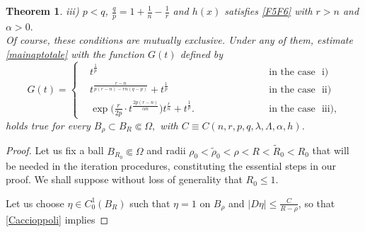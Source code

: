\documentclass[12pt]{amsart}
\newtheorem{theorem}{Theorem}[section]
\theoremstyle{definition}
\numberwithin{equation}{section}
\numberwithin{equation}{section}
\begin{document}
{\begin{theorem}
{ iii)} $p<q$,  $\displaystyle \frac{q}{p} = 1+\frac{1}{n}-\frac{1}{r}$ and $h(x)$ satisfies \eqref{F5F6} with $r>n$
 and $\alpha>0.$
 \\
 Of course, these conditions are mutually exclusive.
 Under any of them,
 estimate  \eqref{mainaptotale} with the function $G(t)$ defined by
 \begin{equation}
\label{DefinizioneG}
G(t)=
\left \{
\begin{array}{lll} \!\!\!\!\!\!&t^{\frac1p}\qquad\qquad\qquad\qquad\qquad\qquad \qquad &\text{in the case { i)}}\\
    \!\!\!\!\!\! & t^\frac{r-n}{p(r-n)-rn(q-p)} + t^{\frac1p}\,\,\quad\qquad\qquad\qquad\qquad & \text{in the case { ii)}}\\
&\exp\Big(\frac{r}{2p}\cdot t^{\frac{2p(r-n)}{\alpha n}}\Big)t^{\frac{r}{n}} + t^{\frac1p}. \qquad\quad & \text{in the case { iii)}},
\end{array}
\right.
\end{equation}
 holds true  for every $B_\rho\subset B_R\Subset\Omega,$ with $C \equiv C(n, r, p, q, \lambda, \Lambda, \alpha, h)$.
\end{theorem}
\begin{proof}
Let us fix a ball $B_{R_0}\Subset \Omega$ and radii $\rho_{0}<\tilde \rho_0<\rho<R<\tilde R_0<R_{0}$ that will be needed in the  iteration procedures, constituting the essential steps in our proof. We shall suppose without loss of generality that $R_0 \le 1$. 

 Let us choose $\eta\in C^1_0(B_{{R}})$ such that $\eta=1$ on $B_{{\rho}}$ and $|D\eta|\le \frac{C}{{R-\rho}}$, so that \eqref{Caccioppoli} implies
 

\end{proof}}
\end{document}
